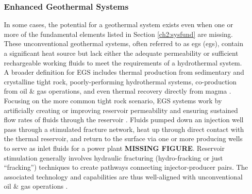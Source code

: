 \subsubsection{Enhanced Geothermal Systems}\label{ch2:egs}
In some cases, the potential for a geothermal system exists even when one or more of the fundamental elements listed in Section \ref{ch2:sysfund} are missing. These unconventional geothermal systems, often referred to as \acrlong{egs} (\acrshort{egs}), contain a significant heat source but lack either the adequate permeability or sufficient rechargeable working fluids to meet the requirements of a hydrothermal system. A broader definition for EGS includes thermal production from sedimentary and crystalline tight rock, poorly-performing hydrothermal systems, co-production from oil \& gas operations, and even thermal recovery directly from magma \citep{tester_future_2006}. Focusing on the more common tight rock scenario, EGS systems work by artificially creating or improving reservoir permeability and ensuring sustained flow rates of fluids through the reservoir \citep[~p. 281]{glassley_geothermal_2015}. Fluids pumped down an injection well pass through a stimulated fracture network, heat up through direct contact with the thermal reservoir, and return to the surface via one or more producing wells to serve as inlet fluids for a power plant \textbf{MISSING FIGURE}. Reservoir stimulation generally involves hydraulic fracturing (hydro-fracking or just “fracking”) techniques to create pathways connecting injector-producer pairs. The associated technology and capabilities are thus well-aligned with unconventional oil \& gas operations \citep{petty_synergies_2009}. 

